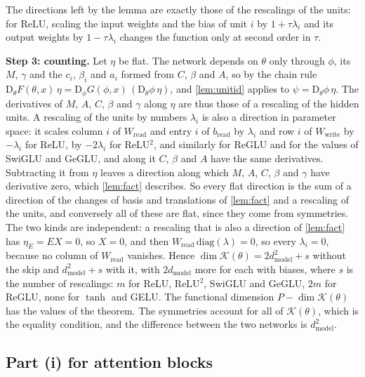 \documentclass[10pt]{article}
\theoremstyle{definition}
\theoremstyle{remark}
\newcommand{\Wread}{W_{\mathrm{read}}}
\newcommand{\Wwrite}{W_{\mathrm{write}}}
\newcommand{\dm}{d_{\mathrm{model}}}
\newcommand{\Der}{\mathrm{D}}
\newcommand{\para}[1]{\smallskip\noindent\textbf{#1}\hspace{0.5em}}
\begin{document}
The directions left by the lemma are exactly those of the rescalings of the units: for ReLU, scaling the input weights and the bias of unit $i$ by $1 + \tau\lambda_i$ and its output weights by $1 - \tau\lambda_i$ changes the function only at second order in $\tau$.

\para{Step 3: counting.} Let $\eta$ be flat. The network depends on $\theta$ only through $\phi$, its $M$, $\gamma$ and the $c_i$, $\beta_i$ and $a_i$ formed from $C$, $\beta$ and $A$, so by the chain rule $\Der_\theta F(\theta, x)\,\eta = \Der_\phi G(\phi, x)\,(\Der_\theta\phi\,\eta)$, and \cref{lem:unitid} applies to $\psi = \Der_\theta\phi\,\eta$. The derivatives of $M$, $A$, $C$, $\beta$ and $\gamma$ along $\eta$ are thus those of a rescaling of the hidden units. A rescaling of the units by numbers $\lambda_i$ is also a direction in parameter space: it scales column $i$ of $\Wread$ and entry $i$ of $b_{\mathrm{read}}$ by $\lambda_i$ and row $i$ of $\Wwrite$ by $-\lambda_i$ for ReLU, by $-2\lambda_i$ for ReLU$^2$, and similarly for ReGLU and for the values of SwiGLU and GeGLU, and along it $C$, $\beta$ and $A$ have the same derivatives. Subtracting it from $\eta$ leaves a direction along which $M$, $A$, $C$, $\beta$ and $\gamma$ have derivative zero, which \cref{lem:fact} describes. So every flat direction is the sum of a direction of the changes of basis and translations of \cref{lem:fact} and a rescaling of the units, and conversely all of these are flat, since they come from symmetries. The two kinds are independent: a rescaling that is also a direction of \cref{lem:fact} has $\eta_E = EX = 0$, so $X = 0$, and then $\Wread\,\mathrm{diag}(\lambda) = 0$, so every $\lambda_i = 0$, because no column of $\Wread$ vanishes. Hence $\dim\mathcal K(\theta) = 2\dm^2 + s$ without the skip and $\dm^2 + s$ with it, with $2\dm$ more for each with biases, where $s$ is the number of rescalings: $m$ for ReLU, ReLU$^2$, SwiGLU and GeGLU, $2m$ for ReGLU, none for $\tanh$ and GELU. The functional dimension $P - \dim\mathcal K(\theta)$ has the values of the theorem. The symmetries account for all of $\mathcal K(\theta)$, which is the equality condition, and the difference between the two networks is $\dm^2$.

\subsection*{Part (i) for attention blocks}
\end{document}
